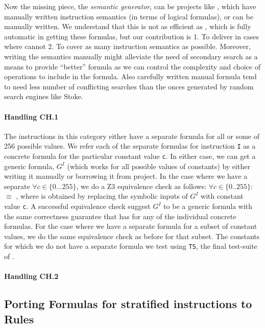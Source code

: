    Now the missing piece, the  \emph{semantic generator}, can be  projects like \Stoke, which have manually written instruction semantics (in terms of logical formulas), or can be manually written.  We understand that this is not as efficient as \Stoke, which is fully automatic in getting these formulas, but our contribution is 1. To deliver in cases where \Stoke cannot   2. To cover  as many instruction semantics as possible. Moreover, writing the semantics manually might alleviate the need of secondary search as a means to provide ``better'' formula as we can control the complexity and choice of operations to include in the formula. Also carefully written manual formula tend to need less number of conflicting searches than the onces generated by random search engines like Stoke.
   
   \paragraph{Handling CH.1}
   The instructions in this category either  have a separate formula for all or some of 256 possible values. We refer each of the separate formulas for instruction {\tt I} as a concrete formula  for the particular constant value {\tt c}.  
   In either case, we can get a generic formula, $G^I$ (which works for all possible values of constants)  by either writing it manually or borrowing it from  \Stoke project. In the case where we have a separate  $\forall c \in \{0...255\}$, we do a Z3 equivalence check as follows: $\forall c \in \{0..255\}:$  $\equiv$ , where  is obtained by replacing the symbolic inputs of $G^I$ with constant value {\tt c}. A successful equivalence check suggest $G^I$ to be a generic formula with the same correctness guarantee that \Strata has for any of the individual concrete formulas. For the case where we have a separate formula for a subset of constant values, we do the same equivalence check as before for that subset. The constants for which we do not have a separate formula we test  using {\tt TS}, the final test-suite of \Strata.  
    
   \paragraph{Handling CH.2}
     
   
  

\subsection{Porting Formulas for stratified instructions to \K Rules}


